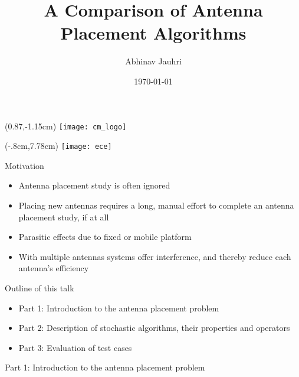 \documentclass{beamer}
\title{\color{univred} A Comparison of Antenna Placement Algorithms}
\author{Abhinav Jauhri}
\date{\today}
\let\otp\titlepage
\renewcommand{\titlepage}{\otp\addtocounter{framenumber}{-1}}
\begin{document}
\begin{frame}[plain]
    \begin{textblock*}{100mm}(0.87\textwidth,-1.15cm)
        \texttt{[image: cm\_logo]}
    \end{textblock*}
    \begin{textblock*}{10mm}(-.8cm,7.78cm)
        \texttt{[image: ece]}
    \end{textblock*}
    \color{univred}
    \titlepage
\end{frame}

\begin{frame}{Motivation}
\begin{itemize} \itemsep1.5em
        \item Antenna placement study is often ignored 
        \item Placing new antennas requires a long, manual effort to complete an antenna placement study, if at all
        \item Parasitic effects due to fixed or mobile platform 
        \item With multiple antennas systems offer interference, and thereby reduce each antenna's efficiency
    \end{itemize}
    \vspace{5mm}
\end{frame}

\begin{frame}{Outline of this talk}
    \begin{itemize}
        \setlength\itemsep{2em}
        \item Part 1: Introduction to the antenna placement problem
        \item Part 2: Description of stochastic algorithms, their properties and operators
        \item Part 3: Evaluation of test cases
    \end{itemize}
\end{frame}

\begin{frame}{\null}
    \begin{tcolorbox}[colback=green!5]
        \centering\Huge
        Part 1: Introduction to the antenna placement problem
    \end{tcolorbox}
\end{frame}
\end{document}

